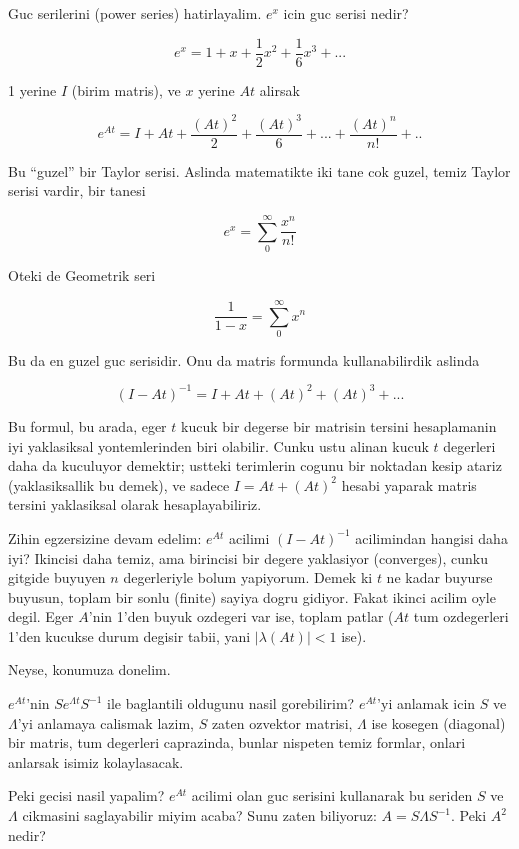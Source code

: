 \documentclass[12pt,fleqn]{article}\usepackage{../common}
\begin{document}
Guc serilerini (power series) hatirlayalim. $e^{x}$ icin guc serisi nedir? 

\[ e^x = 1 + x + \frac{1}{2}x^2 + \frac{1}{6}x^3 + ... \]

1 yerine $I$ (birim matris), ve $x$ yerine $At$ alirsak

\[ e^{At} = I + At + \frac{(At)^2}{2} + \frac{(At)^3}{6} + ... +
 \frac{(At)^n}{n!} + ..
\]

Bu ``guzel'' bir Taylor serisi. Aslinda matematikte iki tane cok guzel,
temiz Taylor serisi vardir, bir tanesi

\[ e^x = \sum_0^{\infty} \frac{x^n}{n!} \]

Oteki de Geometrik seri

\[ \frac{1}{1-x} = \sum_0^{\infty} x^n\]

Bu da en guzel guc serisidir. Onu da matris formunda kullanabilirdik aslinda

\[ (I-At)^{-1} = I + At + (At)^2 + (At)^3 + ... \]

Bu formul, bu arada, eger $t$ kucuk bir degerse bir matrisin tersini
hesaplamanin iyi yaklasiksal yontemlerinden biri olabilir. Cunku ustu
alinan kucuk $t$ degerleri daha da kuculuyor demektir; ustteki terimlerin
cogunu bir noktadan kesip atariz (yaklasiksallik bu demek), ve sadece 
$I =
At + (At)^2$ hesabi yaparak matris tersini yaklasiksal olarak
hesaplayabiliriz.

Zihin egzersizine devam edelim: $e^{At}$ acilimi $(I-At)^{-1}$ acilimindan
hangisi daha iyi? Ikincisi daha temiz, ama birincisi bir degere yaklasiyor
(converges), cunku gitgide buyuyen $n$ degerleriyle bolum yapiyorum. Demek
ki $t$ ne kadar buyurse buyusun, toplam bir sonlu (finite) sayiya dogru
gidiyor. Fakat ikinci acilim oyle degil. Eger $A$'nin 1'den buyuk ozdegeri
var ise, toplam patlar ($At$ tum ozdegerleri 1'den kucukse durum degisir
tabii, yani $|\lambda(At)| < 1$ ise).

Neyse, konumuza donelim. 

$e^{At}$'nin $Se^{\Lambda t}S^{-1}$ ile baglantili oldugunu nasil
gorebilirim? $e^{At}$'yi anlamak icin $S$ ve $\Lambda$'yi anlamaya calismak
lazim, $S$ zaten ozvektor matrisi, $\Lambda$ ise kosegen (diagonal) bir
matris, tum degerleri caprazinda, bunlar nispeten temiz formlar, onlari
anlarsak isimiz kolaylasacak.

Peki gecisi nasil yapalim? $e^{At}$ acilimi olan guc serisini kullanarak bu
seriden $S$ ve $\Lambda$ cikmasini saglayabilir miyim acaba? Sunu zaten
biliyoruz: $A = S \Lambda S^{-1}$. Peki $A^2$ nedir?
\end{document}
